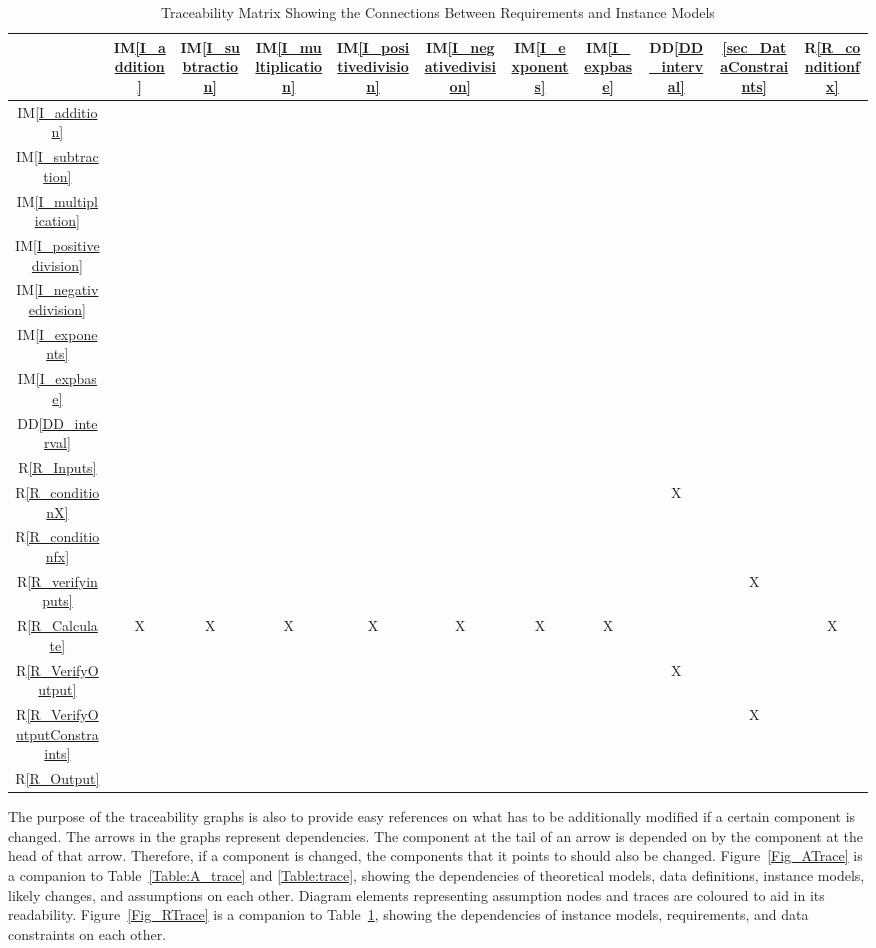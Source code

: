 \documentclass[12pt]{article}
\newcommand{\ddref}[1]{DD\ref{#1}}
\newcommand{\iref}[1]{IM\ref{#1}}
\newcommand{\rref}[1]{R\ref{#1}}
\begin{document}
\begin{table}[H]
	\centering
	\begin{tabular}{|c|c|c|c|c|c|c|c|c|c|c|}
		\hline
		& \iref{I_addition}& \iref{I_subtraction}& \iref{I_multiplication}& 
		\iref{I_positivedivision}& \iref{I_negativedivision}& 
		\iref{I_exponents}& 
		\iref{I_expbase}& \ddref{DD_interval}& \ref{sec_DataConstraints}& 
		\rref{R_conditionfx} \\
		\hline
		\iref{I_addition}            & & & & & & & &&& \\ \hline
		\iref{I_subtraction}            & & & & & & &  &&&\\ \hline
		\iref{I_multiplication}          & & & & & & &  &&&\\ \hline
		\iref{I_positivedivision}          & & & & & & & &&& \\ \hline
		\iref{I_negativedivision}     & & & & & & & &&&\\ \hline
		\iref{I_exponents}    & & & & & & & &&&\\ \hline
		\iref{I_expbase}   & & & & & & & &&&\\ \hline
		\ddref{DD_interval}   & & & & & & & &&&\\ \hline
		\rref{R_Inputs}  & & & & & & &  &&&\\ \hline
		\rref{R_conditionX}     & & & & & & & &X&&\\ \hline 
		\rref{R_conditionfx}       & & & & & & & &&&\\ \hline
		\rref{R_verifyinputs}   & & & & & & & &&X&\\ \hline
		\rref{R_Calculate}     & X&X &X &X &X &X &X &&&X\\ \hline
		\rref{R_VerifyOutput}  & & & & & & & &X&&\\ \hline
		\rref{R_VerifyOutputConstraints} & & & & & & & &&X&\\ \hline
		\rref{R_Output}   & & & & & & & &&&\\ 
		\hline
	\end{tabular}
	\caption{Traceability Matrix Showing the Connections Between Requirements 
	and Instance Models}
	\label{Table:R_trace}
\end{table}

The purpose of the traceability graphs is also to provide easy references on
what has to be additionally modified if a certain component is changed.  The
arrows in the graphs represent dependencies. The component at the tail of an
arrow is depended on by the component at the head of that arrow. Therefore, if a
component is changed, the components that it points to should also be
changed. Figure~\ref{Fig_ATrace} is a companion to Table~\ref{Table:A_trace} 
and \ref{Table:trace}, showing the dependencies of theoretical models, data 
definitions, instance models, likely changes, and assumptions on each other. 
Diagram elements representing assumption nodes and traces are coloured to aid 
in its readability. Figure~\ref{Fig_RTrace} is a companion to 
Table~\ref{Table:R_trace}, showing the dependencies of instance models, 
requirements, and data constraints on each other.
\end{document}
